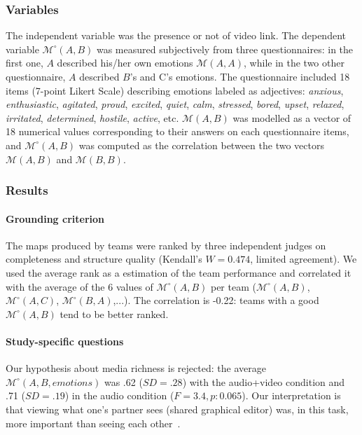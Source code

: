 \documentclass[natbib]{svjour3}
\newcommand{\gmodel}[2]{{$\mathcal{M}(#1, #2)$}}
\newcommand{\Model}[3]{{$\mathcal{M}^{\circ}(#1, #2, #3)$}}
\newcommand{\gModel}[2]{{$\mathcal{M}^{\circ}(#1, #2)$}}
\begin{document}
\subsubsection*{Variables}

The independent variable was the presence or not of video link. The dependent
variable \gModel{A}{B} was measured subjectively from three questionnaires: in the first
one, $A$ described his/her own emotions \gmodel{A}{A}, while in the two other
questionnaire, $A$ described $B$'s and C's emotions. The questionnaire included 18
items (7-point Likert Scale) describing emotions labeled as adjectives:
\emph{anxious}, \emph{enthusiastic}, \emph{agitated}, \emph{proud},
\emph{excited}, \emph{quiet}, \emph{calm}, \emph{stressed}, \emph{bored},
\emph{upset}, \emph{relaxed}, \emph{irritated}, \emph{determined},
\emph{hostile}, \emph{active}, etc. \gmodel{A}{B} was modelled as a vector
of 18 numerical values corresponding to their answers on each
questionnaire items, and \gModel{A}{B} was computed as the correlation between the
two vectors \gmodel{A}{B} and \gmodel{B}{B}.

\subsubsection*{Results}

\paragraph{Grounding criterion} The maps produced by teams were ranked by three
independent judges on completeness and structure quality (Kendall's $W=0.474$,
limited agreement). We used the average rank as a estimation of the team
performance and correlated it with the average of the 6 values of \gModel{A}{B}
per team (\gModel{A}{B}, \gModel{A}{C}, \gModel{B}{A},...). The correlation is
-0.22: teams with a good \gModel{A}{B} tend to be better ranked. 

\paragraph{Study-specific questions} Our hypothesis about media richness is
rejected: the average \Model{A}{B}{emotions} was .62 ($SD = .28$) with the
audio+video condition and .71 ($SD = .19$) in the audio condition ($F=3.4, p:
0.065$). Our interpretation is that viewing what one's partner sees (shared
graphical editor) was, in this task, more important than seeing each
other~\citep{gaver1993one,anderson1997impact}.
\end{document}
